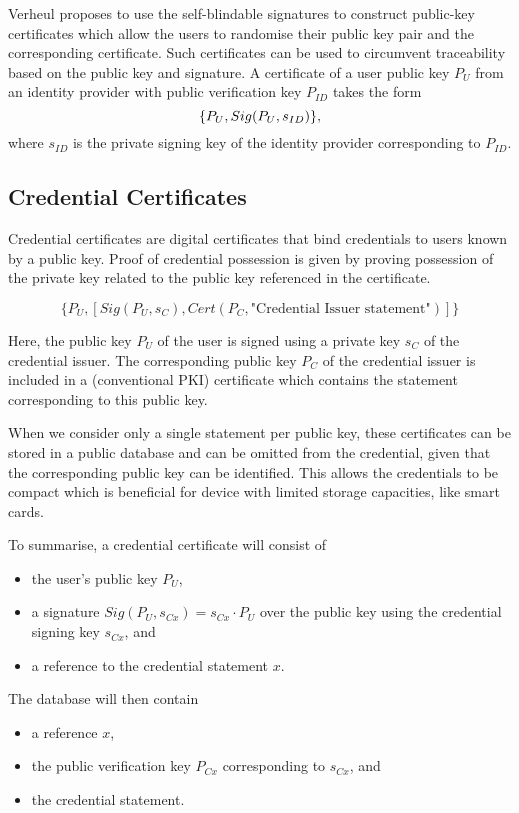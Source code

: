 Verheul proposes to use the self-blindable signatures to construct public-key
certificates which allow the users to randomise their public key pair and the
corresponding certificate. Such certificates can be used to circumvent
traceability based on the public key and signature. A certificate of a user
public key $P_U$ from an identity provider with public verification key $P_{ID}$
takes the form
\begin{equation}\label{eqn:SB-certificate}
  \{ P_U, Sig(P_U, s_{ID}) \}\text,
\end{equation}
where $s_{ID}$ is the private signing key of the identity provider corresponding
to $P_{ID}$.

\subsection{Credential Certificates}

Credential certificates are digital certificates that bind credentials to users
known by a public key. Proof of credential possession is given by proving
possession of the private key related to the public key referenced in the
certificate.

$$\{P_U, [Sig(P_U, s_C), Cert(P_C, \text{"Credential Issuer statement"})]\}$$

Here, the public key $P_U$ of the user is signed using a private key $s_C$ of
the credential issuer. The corresponding public key $P_C$ of the credential
issuer is included in a (conventional PKI) certificate which contains the
statement corresponding to this public key.

When we consider only a single statement per public key, these certificates can
be stored in a public database and can be omitted from the credential, given
that the corresponding public key can be identified. This allows the credentials
to be compact which is beneficial for device with limited storage capacities,
like smart cards.

To summarise, a credential certificate will consist of
\begin{itemize}
  \item the user's public key $P_U$,
  \item a signature $Sig(P_U, s_{Cx}) = s_{Cx} \cdot P_U$ over the public key
    using the credential signing key $s_{Cx}$, and
  \item a reference to the credential statement $x$.
\end{itemize}
The database will then contain
\begin{itemize}
  \item a reference $x$,
  \item the public verification key $P_{Cx}$ corresponding to $s_{Cx}$, and
  \item the credential statement.
\end{itemize}

